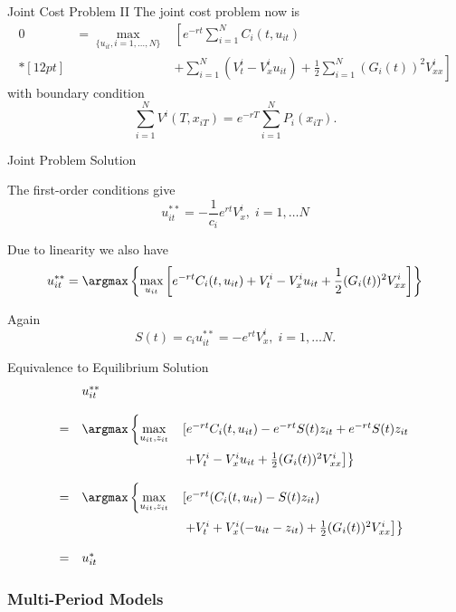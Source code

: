 
{Joint Cost Problem II}
The joint cost problem now is
$$
\begin{array}{lll}
0&=\displaystyle \max_{\{u_{it},i=1, \ldots, N\}}&\displaystyle \left[e^{-rt}\sum_{i=1}^N C_i(t,u_{it})\right.\\*[12pt]
&&+\displaystyle \left.\sum_{i=1}^N (V^i_t -V_x^iu_{it}) + \frac{1}{2}\sum_{i=1}^N(G_i(t))^2 V^i_{xx}\right]
\end{array}
$$
with boundary condition
$$
\sum_{i=1}^N V^i(T, x_{iT})=e^{-rT}\sum_{i=1}^N P_i(x_{iT}).
$$

{Joint Problem Solution}




\item<1-> The first-order conditions give
$$
u_{it}^{**}= -\frac{1}{c_i} e^{rt} V^i_x, \; i=1, \ldots N
$$
\item<2-> Due to linearity we also have
$$
u_{it}^{**}= \argmax \left\{ \max_{u_{it}} \left[e^{-rt} C_i(t,u_{it}) + V^i_t -V_x^iu_{it} + \frac{1}{2}(G_i(t))^2 V^i_{xx}\right]
\right\}
$$
\item<3-> Again
$$
S(t) = c_i u_{it}^{**}= -e^{rt}V^i_x, \; i=1, \ldots N.
$$





{Equivalence to Equilibrium Solution}
$$
\begin{array}{lll}
&u_{it}^{**}&\\*[12pt]
=&  \argmax \left\{ \displaystyle \max_{u_{it},z_{it}} \right. &\left[e^{-rt} C_i(t,u_{it}) -e^{-rt}S(t)z_{it} +e^{-rt}S(t)z_{it} \right.\\*[12pt]
 &&\left.\left. + V^i_t -V_x^iu_{it} + \frac{1}{2}(G_i(t))^2 V^i_{xx}\right]
\right\}\\*[12pt]
=&  \argmax \left\{ \displaystyle \max_{u_{it},z_{it}} \right. &\left[e^{-rt} (C_i(t,u_{it}) -S(t)z_{it}) \right. \\*[12pt]
&&\left.\left. + V^i_t +V_x^i(-u_{it}-z_{it}) + \frac{1}{2}(G_i(t))^2 V^i_{xx}\right]
\right\}\\*[12pt]
=&u_{it}^*&
\end{array}
$$

\subsubsection{Multi-Period Models}

